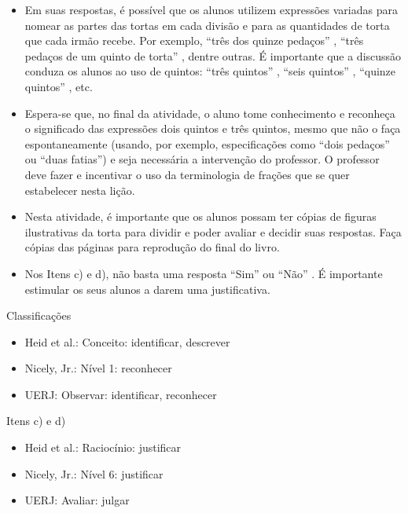 \begin{multicols}{2}
\begin{itemize} %
    \item       Em suas respostas, é possível que os alunos utilizem expressões variadas para nomear as partes das tortas em cada divisão e para as quantidades de torta que cada irmão recebe. Por exemplo,       ``três dos quinze pedaços''      ,       ``três pedaços de um quinto de torta''      , dentre outras. É importante que a discussão conduza os alunos ao uso de quintos:       ``três quintos''      ,       ``seis quintos''      ,       ``quinze quintos''      , etc.
    \item       Espera-se que, no final da atividade, o aluno tome conhecimento e reconheça o significado das expressões dois quintos e três quintos, mesmo que não o faça espontaneamente (usando, por exemplo, especificações como       ``dois pedaços''       ou       ``duas fatias'') e seja necessária a intervenção do professor. O professor deve fazer e incentivar o uso da terminologia de frações que se quer estabelecer nesta lição.
    \item       Nesta atividade, é importante que os alunos possam ter cópias de figuras ilustrativas da torta para dividir e poder avaliar e decidir suas respostas. Faça cópias das páginas para reprodução do final do livro.
    \item       Nos Itens c) e d), não basta uma resposta       ``Sim''       ou       ``Não''      . É importante estimular os seus alunos a darem uma justificativa.
\end{itemize} %



  Classificações
\begin{itemize} %
    \item       Heid et al.: Conceito: identificar, descrever
    \item       Nicely, Jr.: Nível 1: reconhecer
    \item       UERJ: Observar: identificar, reconhecer
\end{itemize} %

  Itens c) e d)
\begin{itemize} %
    \item       Heid et al.: Raciocínio: justificar
    \item       Nicely, Jr.: Nível 6: justificar
    \item       UERJ: Avaliar: julgar
\end{itemize} %


\end{multicols}
